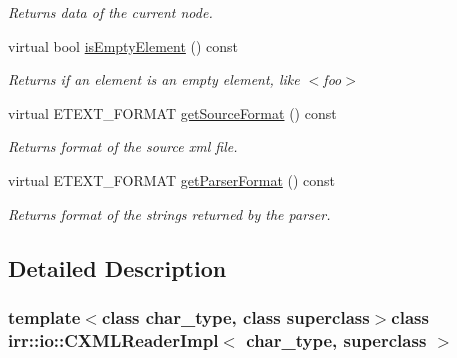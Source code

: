\begin{DoxyCompactItemize}
\begin{DoxyCompactList}\small\item\em Returns data of the current node. \end{DoxyCompactList}\item 
\hypertarget{classirr_1_1io_1_1_c_x_m_l_reader_impl_a17154683d277084155fe6c5556cc0672}{virtual bool \hyperlink{classirr_1_1io_1_1_c_x_m_l_reader_impl_a17154683d277084155fe6c5556cc0672}{is\-Empty\-Element} () const }\label{classirr_1_1io_1_1_c_x_m_l_reader_impl_a17154683d277084155fe6c5556cc0672}

\begin{DoxyCompactList}\small\item\em Returns if an element is an empty element, like $<$foo$>$ \end{DoxyCompactList}\item 
\hypertarget{classirr_1_1io_1_1_c_x_m_l_reader_impl_a0947ce3e44eb7c324ff1bdb430dedfa8}{virtual E\-T\-E\-X\-T\-\_\-\-F\-O\-R\-M\-A\-T \hyperlink{classirr_1_1io_1_1_c_x_m_l_reader_impl_a0947ce3e44eb7c324ff1bdb430dedfa8}{get\-Source\-Format} () const }\label{classirr_1_1io_1_1_c_x_m_l_reader_impl_a0947ce3e44eb7c324ff1bdb430dedfa8}

\begin{DoxyCompactList}\small\item\em Returns format of the source xml file. \end{DoxyCompactList}\item 
\hypertarget{classirr_1_1io_1_1_c_x_m_l_reader_impl_adc53297eecc7760721a6bd4d3875c12b}{virtual E\-T\-E\-X\-T\-\_\-\-F\-O\-R\-M\-A\-T \hyperlink{classirr_1_1io_1_1_c_x_m_l_reader_impl_adc53297eecc7760721a6bd4d3875c12b}{get\-Parser\-Format} () const }\label{classirr_1_1io_1_1_c_x_m_l_reader_impl_adc53297eecc7760721a6bd4d3875c12b}

\begin{DoxyCompactList}\small\item\em Returns format of the strings returned by the parser. \end{DoxyCompactList}\end{DoxyCompactItemize}


\subsection{Detailed Description}
\subsubsection*{template$<$class char\-\_\-type, class superclass$>$class irr\-::io\-::\-C\-X\-M\-L\-Reader\-Impl$<$ char\-\_\-type, superclass $>$}

